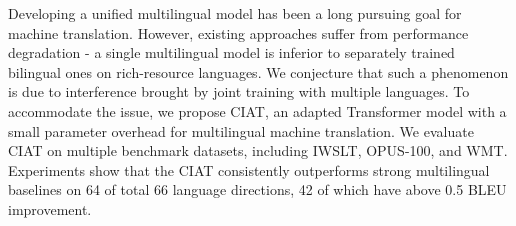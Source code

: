 Developing a unified multilingual model has been a long pursuing goal for machine translation. However, existing approaches suffer from performance degradation - a single multilingual model is inferior to separately trained bilingual ones on rich-resource languages. We conjecture that such a phenomenon is due to interference brought by joint training with multiple languages. To accommodate the issue, we propose CIAT, an adapted Transformer model with a small parameter overhead for multilingual machine translation. We evaluate CIAT on multiple benchmark datasets, including IWSLT, OPUS-100, and WMT. Experiments show that the CIAT consistently outperforms strong multilingual baselines on 64 of total 66 language directions, 42 of which have above 0.5 BLEU improvement.
